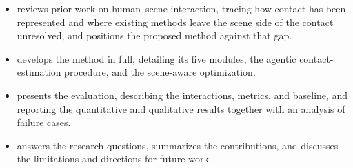 \begin{itemize}
  \item {} reviews prior work on human--scene interaction, tracing how contact has been represented and where existing methods leave the scene side of the contact unresolved, and positions the proposed method against that gap.
  \item {} develops the method in full, detailing its five modules, the agentic contact-estimation procedure, and the scene-aware optimization.
  \item {} presents the evaluation, describing the interactions, metrics, and baseline, and reporting the quantitative and qualitative results together with an analysis of failure cases.
  \item {} answers the research questions, summarizes the contributions, and discusses the limitations and directions for future work.
\end{itemize}
 
